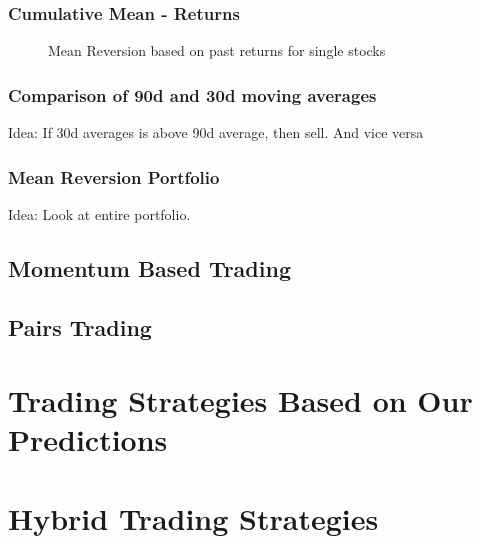 \subsubsection{Cumulative Mean - Returns}

\begin{figure}
    \centering
    \begin{adjustbox}{width=.7\textwidth,center}
        
    \end{adjustbox}  
    \caption{Mean Reversion based on past returns for single stocks}
    \label{fig:mean_reversion_returns}
\end{figure}{}

\subsubsection{Comparison of 90d and 30d moving averages}
Idea: If 30d averages is above 90d average, then sell. And vice versa

\subsubsection{Mean Reversion Portfolio}
Idea: Look at entire portfolio. 




\subsection{Momentum Based Trading}


\subsection{Pairs Trading}



\section{Trading Strategies Based on Our Predictions}



\section{Hybrid Trading Strategies}



